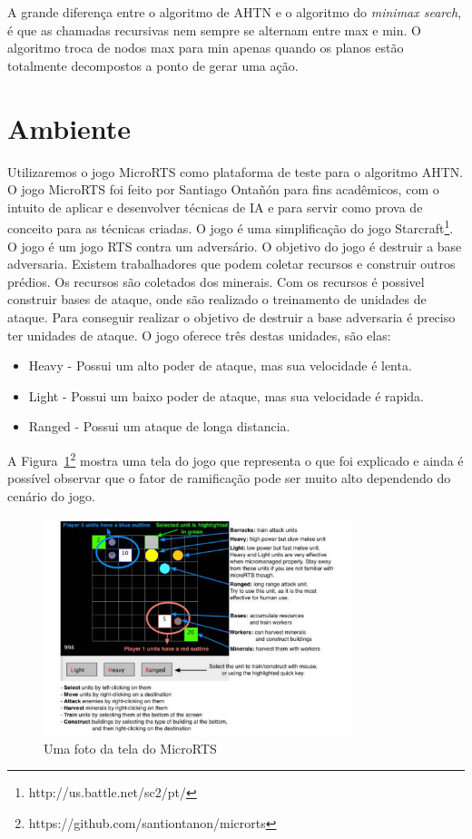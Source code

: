 A grande diferença entre o algoritmo de AHTN e o algoritmo do \textit{minimax search}, é que as chamadas recursivas nem sempre se alternam entre max e min. O algoritmo troca de nodos max para min apenas quando os planos estão totalmente decompostos a ponto de gerar uma ação. 

\section{Ambiente}

Utilizaremos o jogo MicroRTS como plataforma de teste para o algoritmo AHTN. O jogo MicroRTS foi feito por Santiago Ontañón \cite{ontanon2013combinatorial} para fins acadêmicos, com o intuito de aplicar e desenvolver técnicas de IA e para servir como prova de conceito para as técnicas criadas.  
O jogo é uma simplificação do jogo Starcraft\footnote{http://us.battle.net/sc2/pt/}. O jogo é um jogo RTS contra um adversário. O objetivo do jogo é destruir a base adversaria. Existem trabalhadores que podem coletar recursos e construir outros prédios. Os recursos são coletados dos minerais. Com os recursos é possivel construir bases de ataque, onde são realizado o treinamento de unidades de ataque. Para conseguir realizar o objetivo de destruir a base adversaria é preciso ter unidades de ataque. O jogo oferece três destas unidades, são elas:

\begin{itemize}
	\item Heavy - Possui um alto poder de ataque, mas sua velocidade é lenta.
	\item Light - Possui um baixo poder de ataque, mas sua velocidade é rapida.
	\item Ranged - Possui um ataque de longa distancia. 
\end{itemize} 

A Figura~\ref{fig:microrts}\footnote{https://github.com/santiontanon/microrts} mostra uma tela do jogo que representa o que foi explicado e ainda é possível observar que o fator de ramificação pode ser muito alto dependendo do cenário do jogo. %

\begin{figure}[ht]
	\centering
	\includegraphics[width=0.8\textwidth]{fig/microrts.pdf}
	\caption{Uma foto da tela do MicroRTS}
	\label{fig:microrts}
\end{figure} 

